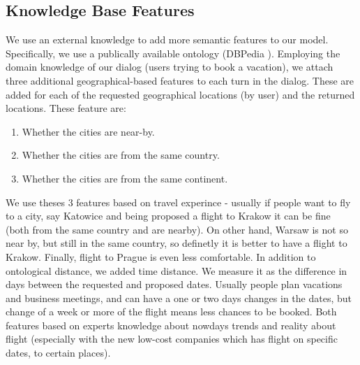\subsection{Knowledge Base Features}
We use an external knowledge to add more semantic features to our model. Specifically, we use a publically available ontology (DBPedia \cite{dbpedia}).
Employing the domain knowledge of our dialog (users trying to book a vacation), we attach three additional geographical-based features to each turn in the dialog. These are added for each of the requested geographical locations (by user) and the returned locations. These feature are: 

\begin{enumerate}
\item Whether the cities are near-by.
\item Whether the cities are from the same country.
\item Whether the cities are from the same continent.
\end{enumerate}

We use theses 3 features based on travel experince - usually if people want to fly to a city, say Katowice and being proposed a flight to Krakow it can be fine (both from the same country and are nearby). On other hand, Warsaw is not so near by, but still in the same country, so definetly it is better to have a flight to Krakow. Finally, flight to Prague is even less comfortable.
In addition to ontological distance, we added time distance. We measure it as the difference in days between the requested and proposed dates. Usually people plan vacations and business meetings, and can have a one or two days changes in the dates, but change of a week or more of the flight means less chances to be booked.
Both features based on experts knowledge about nowdays trends and reality about flight (especially with the new low-cost companies which has flight on specific dates, to certain places).
